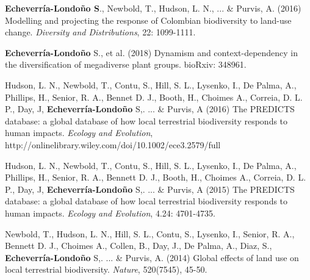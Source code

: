 \documentclass[svgnames,11pt,longbibliography,reqno]{article}
\begin{document}
\begin{bibenum}[itemsep=5pt]


\item \textbf{Echeverr\'ia-Londo\~no S}., Newbold, T., Hudson, L. N., ... \& Purvis, A. (2016) Modelling and projecting the response of Colombian biodiversity to land-use change. \textit{Diversity and Distributions}, 22: 1099-1111. 

\item \textbf{Echeverr\'ia-Londo\~no} S., et al.  (2018) Dynamism and context-dependency in the diversification of megadiverse plant groups. bioRxiv: 348961.

 \item Hudson, L. N., Newbold, T., Contu, S., Hill, S. L., Lysenko, I., De Palma, A., Phillips, H., Senior, R. A., Bennet D. J., Booth, H., Choimes A., Correia, D. L. P., Day, J, \textbf{Echeverr\'ia-Londo\~no} S,. ... \& Purvis, A (2016) The PREDICTS database: a global database of how local terrestrial biodiversity responds to human impacts. \textit{Ecology and Evolution}, http://onlinelibrary.wiley.com/doi/10.1002/ece3.2579/full

 \item Hudson, L. N., Newbold, T., Contu, S., Hill, S. L., Lysenko, I., De Palma, A., Phillips, H., Senior, R. A., Bennett D. J., Booth, H., Choimes A., Correia, D. L. P., Day, J, \textbf{Echeverr\'ia-Londo\~no} S,. ... \& Purvis, A (2015) The PREDICTS database: a global database of how local terrestrial biodiversity responds to human impacts. \textit{Ecology and Evolution}, 4.24: 4701-4735.

 \item Newbold, T., Hudson, L. N., Hill, S. L., Contu, S., Lysenko, I., Senior, R. A., Bennett D. J., Choimes A., Collen, B., Day, J., De Palma, A., Diaz, S., \textbf{Echeverr\'ia-Londo\~no} S,. ... \& Purvis, A. (2014) Global effects of land use on local terrestrial biodiversity. \textit{Nature}, 520(7545), 45-50.



\end{bibenum}
\end{document}
